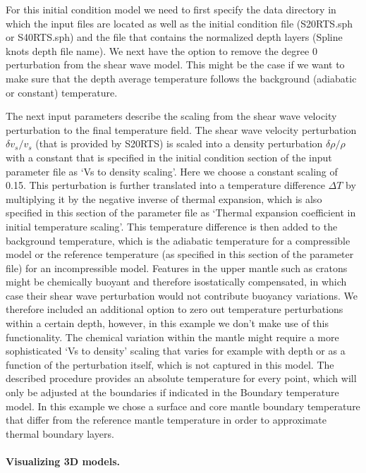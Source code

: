 \documentclass{article}
\begin{document}
For this initial condition model we need to first specify the data directory in which 
the input files are located as well as the initial condition file (S20RTS.sph or 
S40RTS.sph) and the file that contains the normalized depth layers (Spline knots depth file name). 
We next have the option to remove the degree 0 perturbation from the shear 
wave model. This might be the case if we want to make sure that the depth 
average temperature follows the background (adiabatic or constant) temperature.  

The next input parameters describe the scaling from the shear wave velocity 
perturbation to the final temperature field. The shear wave velocity perturbation 
$\delta v_s / v_s$ (that is provided by S20RTS) is scaled into a density perturbation $\delta \rho / \rho$ with a 
constant that is specified in the initial condition section of the input parameter 
file as `Vs to density scaling'. Here we choose a constant scaling of 0.15. This 
perturbation is further translated into a temperature difference $\Delta T$ by 
multiplying it by the negative inverse of thermal expansion, which is also 
specified in this section of the parameter file as `Thermal expansion coefficient 
in initial temperature scaling'. This temperature difference is then added to the 
background temperature, which is the adiabatic temperature for a compressible 
model or the reference temperature (as specified in this section of the parameter file) for an 
incompressible model. Features in the upper mantle such as cratons might 
be chemically buoyant and therefore isostatically compensated, in which case 
their shear wave perturbation would not contribute buoyancy variations. We therefore included an 
additional option to zero out temperature perturbations within a certain depth, however, in this example we don't make use of this functionality. The chemical variation within the mantle 
might require a more sophisticated `Vs to density' scaling that varies for 
example with depth or as a function of the perturbation itself, which is not captured
in this model. The described procedure 
provides an absolute temperature for every point, which will only be adjusted 
at the boundaries if indicated in the Boundary temperature model. In this example
we chose a surface and core mantle boundary temperature that differ from the
reference mantle temperature in order to approximate thermal boundary layers.

\paragraph{Visualizing 3D models.}
\end{document}

